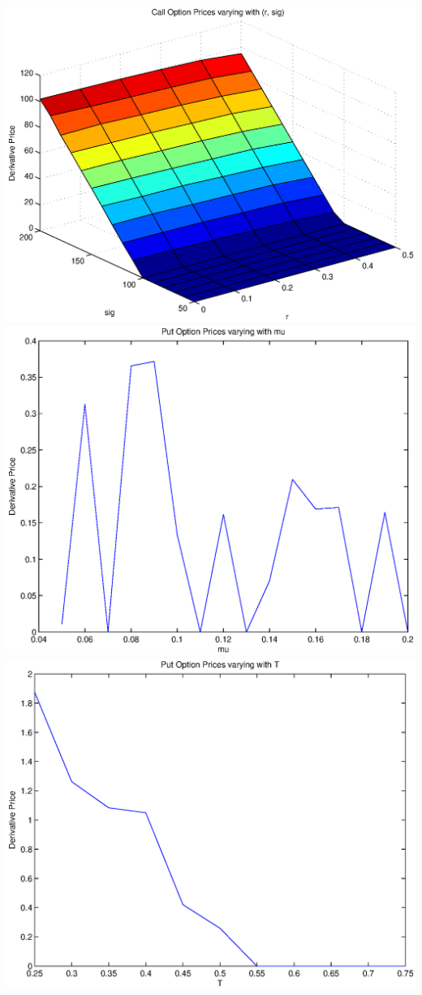 \documentclass{article}
\begin{document}
\includegraphics[width=\textwidth]{Call_Option_Prices_varying_with_(r,_sig)}
\includegraphics[width=\textwidth]{Put_Option_Prices_varying_with_mu}
\includegraphics[width=\textwidth]{Put_Option_Prices_varying_with_T}
\end{document}
